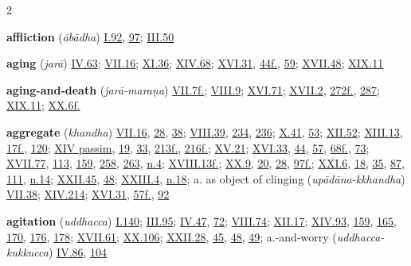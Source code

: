 \begin{multicols}{2}
\begin{vismHanging}
\par\textbf{affliction} (\emph{ābādha}) \hyperlink{I.92}{I.92}{}, \hyperlink{I.97}{97}{}; \hyperlink{III.50}{III.50}{}
\par\textbf{aging} (\emph{jarā}) \hyperlink{IV.63}{IV.63}{}; \hyperlink{VII.16}{VII.16}{}; \hyperlink{XI.36}{XI.36}{}; \hyperlink{XIV.68}{XIV.68}{}; \hyperlink{XVI.31}{XVI.31}{}, \hyperlink{XVI.44}{44f.}{}, \hyperlink{XVI.59}{59}{}; \hyperlink{XVII.48}{XVII.48}{}; \hyperlink{XIX.11}{XIX.11}{}
\par\textbf{aging-and-death} (\emph{jarā-maraṇa}) \hyperlink{VII.7}{VII.7f.}{}; \hyperlink{VIII.9}{VIII.9}{}; \hyperlink{XVI.71}{XVI.71}{}; \hyperlink{XVII.2}{XVII.2}{}, \hyperlink{XVII.272}{272f.}{}, \hyperlink{XVII.287}{287}{}; \hyperlink{XIX.11}{XIX.11}{}; \hyperlink{XX.6}{XX.6f.}{}
\par\textbf{aggregate} (\emph{khandha}) \hyperlink{VII.16}{VII.16}{}, \hyperlink{VII.28}{28}{}, \hyperlink{VII.38}{38}{}; \hyperlink{VIII.39}{VIII.39}{}, \hyperlink{VIII.234}{234}{}, \hyperlink{VIII.236}{236}{}; \hyperlink{X.41}{X.41}{}, \hyperlink{X.53}{53}{}; \hyperlink{XII.52}{XII.52}{}; \hyperlink{XIII.13}{XIII.13}{}, \hyperlink{XIII.17}{17f.}{}, \hyperlink{XIII.120}{120}{}; \hyperlink{XIV}{XIV passim}{}, \hyperlink{XIV.19}{19}{}, \hyperlink{XIV.33}{33}{}, \hyperlink{XIV.213}{213f.}{}, \hyperlink{XIV.216}{216f.}{}; \hyperlink{XV.21}{XV.21}{}; \hyperlink{XVI.33}{XVI.33}{}, \hyperlink{XVI.44}{44}{}, \hyperlink{XVI.57}{57}{}, \hyperlink{XVI.68}{68f.}{}, \hyperlink{XVI.73}{73}{}; \hyperlink{XVII.77}{XVII.77}{}, \hyperlink{XVII.113}{113}{}, \hyperlink{XVII.159}{159}{}, \hyperlink{XVII.258}{258}{}, \hyperlink{XVII.263}{263}{}, \hyperlink{XVII.n4}{n.4}{}; \hyperlink{XVIII.13}{XVIII.13f.}{}; \hyperlink{XX.9}{XX.9}{}, \hyperlink{XX.20}{20}{}, \hyperlink{XX.28}{28}{}, \hyperlink{XX.97}{97f.}{}; \hyperlink{XXI.6}{XXI.6}{}, \hyperlink{XXI.18}{18}{}, \hyperlink{XXI.35}{35}{}, \hyperlink{XXI.87}{87}{}, \hyperlink{XXI.111}{111}{}, \hyperlink{XXI.n14}{n.14}{}; \hyperlink{XXII.45}{XXII.45}{}, \hyperlink{XXII.48}{48}{}; \hyperlink{XXIII.4}{XXIII.4}{}, \hyperlink{XXIII.n18}{n.18}{}; a. as object of clinging (\emph{upādāna-kkhandha}) \hyperlink{VII.38}{VII.38}{}; \hyperlink{XIV.214}{XIV.214}{}; \hyperlink{XVI.31}{XVI.31}{}, \hyperlink{XVI.57}{57f.}{}, \hyperlink{XVI.92}{92}{}
\par\textbf{agitation} (\emph{uddhacca}) \hyperlink{I.140}{I.140}{}; \hyperlink{III.95}{III.95}{}; \hyperlink{IV.47}{IV.47}{}, \hyperlink{IV.72}{72}{}; \hyperlink{VIII.74}{VIII.74}{}; \hyperlink{XII.17}{XII.17}{}; \hyperlink{XIV.93}{XIV.93}{}, \hyperlink{XIV.159}{159}{}, \hyperlink{XIV.165}{165}{}, \hyperlink{XIV.170}{170}{}, \hyperlink{XIV.176}{176}{}, \hyperlink{XIV.178}{178}{}; \hyperlink{XVII.61}{XVII.61}{}; \hyperlink{XX.106}{XX.106}{}; \hyperlink{XXII.28}{XXII.28}{}, \hyperlink{XXII.45}{45}{}, \hyperlink{XXII.48}{48}{}, \hyperlink{XXII.49}{49}{}; a.-and-worry (\emph{uddhacca-kukkucca}) \hyperlink{IV.86}{IV.86}{}, \hyperlink{IV.104}{104}{}

\end{vismHanging}
\end{multicols}
